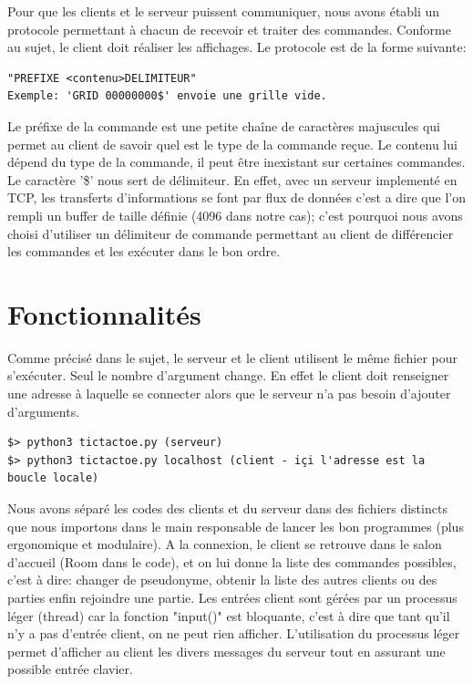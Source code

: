 \documentclass[a4paper]{article}
\begin{document}
Pour que les clients et le serveur puissent communiquer, nous avons établi un protocole permettant à chacun de recevoir et traiter des commandes. Conforme au sujet, le client doit réaliser les affichages. Le protocole est de la forme suivante:
\begin{verbatim}
"PREFIXE <contenu>DELIMITEUR"
Exemple: 'GRID 00000000$' envoie une grille vide.
\end{verbatim}

Le préfixe de la commande est une petite chaîne de caractères majuscules qui permet au client de savoir quel est le type de la commande reçue. Le contenu lui dépend du type de la commande, il peut être inexistant sur certaines commandes.
Le caractère '\$' nous sert de délimiteur. En effet, avec un serveur implementé en TCP, les transferts d'informations se font par flux de données c'est a dire que l'on rempli un buffer de taille définie (4096 dans notre cas); c'est pourquoi nous avons choisi d'utiliser un délimiteur de commande permettant au client de différencier les commandes et les exécuter dans le bon ordre.

\section{Fonctionnalités}

Comme précisé dans le sujet, le serveur et le client utilisent le même fichier pour s'exécuter. Seul le nombre d'argument change. En effet le client doit renseigner une adresse à laquelle se connecter alors que le serveur n'a pas besoin d'ajouter d'arguments.

\begin{verbatim}
$> python3 tictactoe.py (serveur)
$> python3 tictactoe.py localhost (client - içi l'adresse est la boucle locale)
\end{verbatim}

Nous avons séparé les codes des clients et du serveur dans des fichiers distincts que nous importons dans le main responsable de lancer les bon programmes (plus ergonomique et modulaire).
A la connexion, le client se retrouve dans le salon d'accueil (Room dans le code), et on lui donne la liste des commandes possibles, c'est à dire:
changer de pseudonyme,
obtenir la liste des autres clients ou des parties
enfin rejoindre une partie.
Les entrées client sont gérées par un processus léger (thread) car la fonction "input()" est bloquante, c'est à dire que tant qu'il n'y a pas d'entrée client, on ne peut rien afficher. L'utilisation du processus léger permet d'afficher au client les divers messages du serveur tout en assurant une possible entrée clavier.
\end{document}
